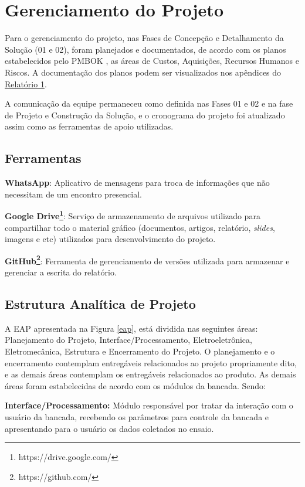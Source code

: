 \chapter{Gerenciamento do Projeto}

Para o gerenciamento do projeto, nas Fases de Concepção e Detalhamento da Solução (01 e 02), foram planejados e documentados, de acordo com os planos estabelecidos pelo PMBOK \cite{pmbok}, as
áreas de Custos, Aquisições, Recursos Humanos e Riscos. A documentação dos planos podem ser visualizados nos apêndices do
\href{https://drive.google.com/file/d/0B5InkGKx6O-MR1B3eVYzZFpjQ3c/view?usp=sharing}{Relatório 1}.

A comunicação da equipe permaneceu como definida nas Fases 01 e 02 e na fase de Projeto e Construção da Solução, e o cronograma do projeto foi atualizado assim como as ferramentas de apoio utilizadas.

\section*{Ferramentas}

\textbf{WhatsApp}:
Aplicativo de mensagens para troca de informações que não necessitam de um encontro presencial.

\textbf{Google Drive\footnote{https://drive.google.com/}}: Serviço de armazenamento de arquivos utilizado para compartilhar todo o material gráfico (documentos, artigos, relatório, \textit{slides}, imagens e etc) utilizados para desenvolvimento do projeto.

\textbf{GitHub\footnote{https://github.com/}}: Ferramenta de gerenciamento de versões utilizada para armazenar e gerenciar
a escrita do relatório.

\section*{Estrutura Analítica de Projeto}

A EAP apresentada na Figura \ref{eap}, está dividida nas seguintes áreas: Planejamento do Projeto, Interface/Processamento, Eletroeletrônica, Eletromecânica, Estrutura e Encerramento do Projeto. O planejamento e o encerramento contemplam entregáveis relacionados ao projeto propriamente dito, e as demais áreas contemplam os entregáveis relacionados ao produto. As demais áreas foram estabelecidas de acordo com os módulos da bancada. Sendo:

\textbf{Interface/Processamento:} Módulo responsável por tratar da interação com o usuário da bancada, recebendo os parâmetros para controle da bancada e apresentando para o usuário os dados coletados no ensaio.

